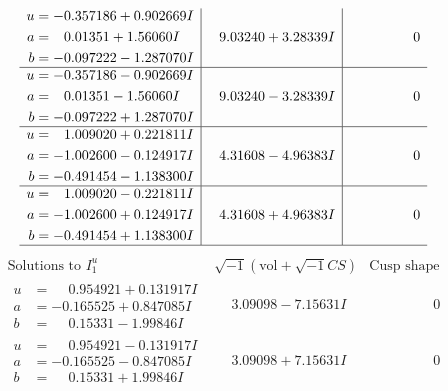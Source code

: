 \documentclass[1p]{elsarticle_modified}
\theoremstyle{definition}
\newcommand{\I}{\sqrt{-1}}
\begin{document}
$$\begin{array}{c|c|c}
\begin{aligned}
u &= -0.357186 + 0.902669 I \\
a &= \phantom{-}0.01351 + 1.56060 I \\
b &= -0.097222 - 1.287070 I\end{aligned}
 & \phantom{-}9.03240 + 3.28339 I & \phantom{-0.000000 } 0 \\ \hline\begin{aligned}
u &= -0.357186 - 0.902669 I \\
a &= \phantom{-}0.01351 - 1.56060 I \\
b &= -0.097222 + 1.287070 I\end{aligned}
 & \phantom{-}9.03240 - 3.28339 I & \phantom{-0.000000 } 0 \\ \hline\begin{aligned}
u &= \phantom{-}1.009020 + 0.221811 I \\
a &= -1.002600 - 0.124917 I \\
b &= -0.491454 - 1.138300 I\end{aligned}
 & \phantom{-}4.31608 - 4.96383 I & \phantom{-0.000000 } 0 \\ \hline\begin{aligned}
u &= \phantom{-}1.009020 - 0.221811 I \\
a &= -1.002600 + 0.124917 I \\
b &= -0.491454 + 1.138300 I\end{aligned}
 & \phantom{-}4.31608 + 4.96383 I & \phantom{-0.000000 } 0\\
 \hline 
 \end{array}$$\newpage$$\begin{array}{c|c|c}  
\text{Solutions to }I^u_{1}& \I (\text{vol} + \sqrt{-1}CS) & \text{Cusp shape}\\
 \hline 
\begin{aligned}
u &= \phantom{-}0.954921 + 0.131917 I \\
a &= -0.165525 + 0.847085 I \\
b &= \phantom{-}0.15331 - 1.99846 I\end{aligned}
 & \phantom{-}3.09098 - 7.15631 I & \phantom{-0.000000 } 0 \\ \hline\begin{aligned}
u &= \phantom{-}0.954921 - 0.131917 I \\
a &= -0.165525 - 0.847085 I \\
b &= \phantom{-}0.15331 + 1.99846 I\end{aligned}
 & \phantom{-}3.09098 + 7.15631 I & \phantom{-0.000000 } 0 \\ \hline\begin{aligned}

\end{aligned}
\end{array}$$
\end{document}
